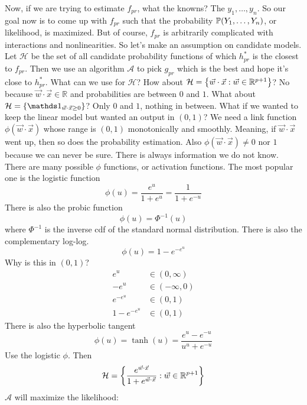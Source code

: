 \documentclass[12pt]{article}
\begin{document}
Now, if we are trying to estimate $f_{pr}$, what the knowns? The $y_1,\dots,y_n$. So our goal now is to come up with $f_{pr}$ such that the probability $\mathbb{P}(Y_1,\dots,Y_n)$, or likelihood, is maximized. But of course, $f_{pr}$ is arbitrarily complicated with interactions and nonlinearities. So let's make an assumption on candidate models. Let $\mathcal{H}$ be the set of all candidate probability functions of which $h^*_{pr}$ is the closest to $f_{pr}$. Then we use an algorithm $\mathcal{A}$ to pick $g_{pr}$ which is the best and hope it's close to $h^*_{pr}$. What can we use for $\mathcal{H}$? How about $\mathcal{H} = \left\{ \vec{w}\cdot \vec{x}: \vec{w} \in \mathbb{R}^{p+1} \right\}$? No because $\vec{w} \cdot \vec{x} \in \mathbb{R}$ and probabilities are between $0$ and $1$. What about $\mathcal{H} = \set{\indicator{\vec{w} \cdot \vec{x} \geq 0}}$? Only $0$ and $1$, nothing in between. What if we wanted to keep the linear model but wanted an output in $(0,1)$? We need a link function $\phi(\vec{w} \cdot \vec{x})$ whose range is $(0,1)$ monotonically and smoothly. Meaning, if $\vec{w} \cdot \vec{x}$ went up, then so does the probability estimation. Also $\phi(\vec{w} \cdot \vec{x}) \neq 0$ nor $1$ because we can never be sure. There is always information we do not know. There are many possible $\phi$ functions, or activation functions. The most popular one is the logistic function $$ \phi(u) = \frac{e^u}{1 + e^u} = \frac{1}{1 + e^{-u}} $$ There is also the probic function $$ \phi(u) = \Phi^{-1}(u) $$ where $\Phi^{-1}$ is the inverse cdf of the standard normal distribution. There is also the complementary log-log. 
$$ \phi(u) = 1 - e^{-e^u} $$ 
Why is this in $(0,1)$? $$ \begin{aligned} e^u &\in (0,\infty) \\ -e^u &\in (-\infty,0) \\ e^{-e^u} &\in (0,1) \\ 1 - e^{-e^u} &\in (0,1) \end{aligned} $$ 
There is also the hyperbolic tangent $$ \phi(u) = \tanh(u) = \frac{e^u - e^{-u}}{u^u + e^{-u}} $$ 
Use the logistic $\phi$. Then $$ \mathcal{H} = \left\{  \frac{e^{\vec{w} \cdot \vec{x}}}{1 + e^{\vec{w} \cdot \vec{x}}}: \vec{w} \in \mathbb{R}^{p+1} \right\} $$ $\mathcal{A}$ will maximize the likelihood: 
\end{document}
